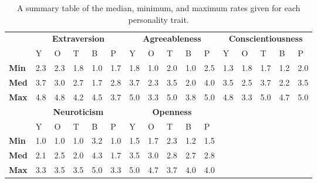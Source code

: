 \begin{table}[hbt!]
    \renewcommand{\arraystretch}{1}
    \begin{center}
        \begin{tabular}{p{}|
        p{}|p{}|p{}|p{}|p{}||
        p{}|p{}|p{}|p{}|p{}||
        p{}|p{}|p{}|p{}|p{}|}
            \cline{2-16}
            & \multicolumn{5}{c||}{\textbf{Extraversion}} & \multicolumn{5}{c||}{\textbf{Agreeableness}}
            & \multicolumn{5}{c|}{\textbf{Conscientiousness}} \\
            \cline{2-16}
            & Y & O & T & B & P & Y & O & T & B & P & Y & O & T & B & P     \\
            \cline{2-16}
            \textbf{Min}    & 2.3 & 2.3 & 1.8 & 1.0 & 1.7 & 1.8 & 1.0 & 2.0 & 1.0 & 2.5 & 1.3 & 1.8 & 1.7 & 1.2 & 2.0  \\
            \textbf{Med}    & 3.7 & 3.0 & 2.7 & 1.7 & 2.8 & 3.7 & 2.3 & 3.5 & 2.0 & 4.0 & 3.5 & 2.5 & 3.7 & 2.2 & 3.5  \\
            \textbf{Max}    & 4.8 & 4.8 & 4.2 & 4.5 & 3.7 & 5.0 & 3.3 & 5.0 & 3.8 & 5.0 & 4.8 & 3.3 & 5.0 & 4.7 & 5.0 \\
            \cline{2-16}
            \cline{2-11}
            &  \multicolumn{5}{|c||}{\textbf{Neuroticism}} & \multicolumn{5}{|c||}{\textbf{Openness}} \\
            \cline{2-11}
            & Y & O & T & B & P & Y & O & T & B & P            \\
            \cline{2-11}
            \textbf{Min}    & 1.0 & 1.0 & 1.0 & 3.2 & 1.0 & 1.5 & 1.7 & 2.3 & 1.2 & 1.5    \\
            \textbf{Med}    & 2.1 & 2.5 & 2.0 & 4.3 & 1.7 & 3.5 & 3.0 & 2.8 & 2.7 & 2.8    \\
            \textbf{Max}    & 3.3 & 3.5 & 3.5 & 5.0 & 3.3 & 5.0 & 4.7 & 3.7 & 4.0 & 4.0    \\
            \cline{2-11}
        \end{tabular}
        \caption[]{A summary table of the median, minimum, and maximum rates given for each personality trait.\footnotemark}
        \label{table:medianML1}
    \end{center}
\end{table}

